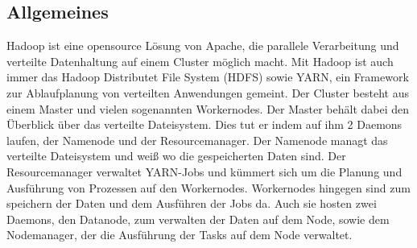 \documentclass[12pt,oneside,a4paper,parskip]{scrbook}
\begin{document}
\subsection{Allgemeines}
Hadoop ist eine opensource Lösung von Apache, die parallele Verarbeitung und verteilte Datenhaltung auf einem Cluster möglich macht. Mit Hadoop ist auch immer das Hadoop Distributet File System (HDFS) sowie YARN, ein Framework zur Ablaufplanung von verteilten Anwendungen gemeint. \newline
Der Cluster besteht aus einem Master und vielen sogenannten Workernodes. Der Master behält dabei den Überblick über das verteilte Dateisystem. Dies tut er indem auf ihm 2 Daemons laufen, der Namenode und der Resourcemanager. Der Namenode managt das verteilte Dateisystem und weiß wo die gespeicherten Daten sind. Der Resourcemanager verwaltet YARN-Jobs und kümmert sich um die Planung und Ausführung von Prozessen auf den Workernodes. \newline
Workernodes hingegen sind zum speichern der Daten und dem Ausführen der Jobs da. Auch sie hosten zwei Daemons, den Datanode, zum verwalten der Daten auf dem Node, sowie dem Nodemanager, der die Ausführung der Tasks auf dem Node verwaltet.
\end{document}

